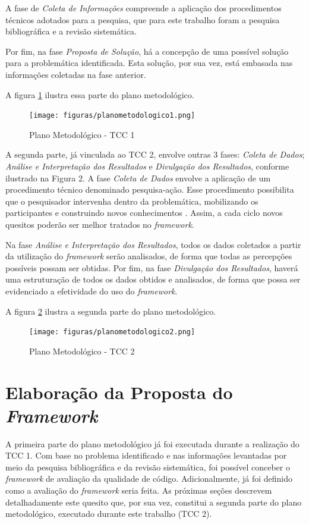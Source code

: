 A fase de \textit{Coleta de Informações} compreende a aplicação dos procedimentos técnicos adotados para a pesquisa, que para este trabalho foram a pesquisa bibliográfica e a revisão sistemática.

Por fim, na fase \textit{Proposta de Solução}, há a concepção de uma possível solução para a problemática identificada. Esta solução, por sua vez, está embasada nas informações coletadas na fase anterior.

A figura \ref{fig:plano1} ilustra essa parte do plano metodológico.

\begin{figure}[h]
\texttt{[image: figuras/planometodologico1.png]}
\caption{Plano Metodológico - TCC 1}
\label{fig:plano1}
\end{figure}

A segunda parte, já vinculada ao TCC 2, envolve outras 3 fases: \textit{Coleta de Dados}; \textit{Análise e Interpretação dos Resultados} e \textit{Divulgação dos Resultados}, conforme ilustrado na Figura 2.
A fase \textit{Coleta de Dados} envolve a aplicação de um procedimento técnico denominado pesquisa-ação. Esse procedimento possibilita que o pesquisador intervenha dentro da problemática, mobilizando os participantes e construindo novos conhecimentos \cite{pesquisa}. Assim, a cada ciclo novos quesitos poderão ser melhor tratados no \textit{framework}.

Na fase \textit{Análise e Interpretação dos Resultados}, todos os dados coletados a partir da utilização do \textit{framework} serão analisados, de forma que todas as percepções possíveis possam ser obtidas. Por fim, na fase \textit{Divulgação dos Resultados}, haverá uma estruturação de todos os dados obtidos e analisados, de forma que possa ser evidenciado a efetividade do uso do \textit{framework}.

A figura \ref{fig:plano2} ilustra a segunda parte do plano metodológico.

\begin{figure}[h]
\texttt{[image: figuras/planometodologico2.png]}
\caption{Plano Metodológico - TCC 2}
\label{fig:plano2}
\end{figure}

\section{Elaboração da Proposta do \textit{Framework}}

A primeira parte do plano metodológico já foi executada durante a realização do TCC 1. Com base no problema identificado e nas informações levantadas por meio da pesquisa bibliográfica e da revisão sistemática, foi possível conceber o \textit{framework} de avaliação da qualidade de código. Adicionalmente, já foi definido como a avaliação do \textit{framework} seria feita. As próximas seções descrevem detalhadamente este quesito que, por sua vez, constitui a segunda parte do plano metodológico, executado durante este trabalho (TCC 2).

